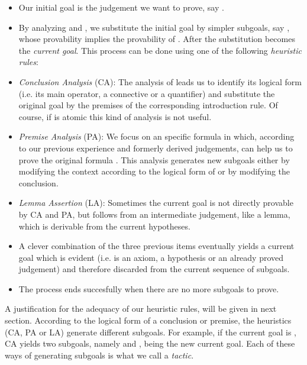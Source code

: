 \documentclass[a4paper,UKenglish]{lipics}
\begin{document}
\begin{itemize}
\item[]Our initial goal is the judgement we want to prove, say .
\item[]By analyzing  and , we substitute the initial goal  by simpler subgoals, say , whose provability implies the provability of . After the substitution  becomes the {\sl current goal}. This process can be done using one of the following {\em heuristic rules}:
\item[] {\em Conclusion Analysis} (CA): The analysis of  leads us to identify its 
logical form (i.e. its main operator, a connective or a quantifier) and substitute the original goal by the premises of the corresponding introduction rule. Of course, if  is atomic this kind of analysis is not useful. 
\item[]{\em Premise Analysis} (PA): We focus on an specific formula  in  which, according to our previous experience and formerly derived judgements, can help us to prove the original formula . This analysis generates new subgoals either by modifying the context according to the logical form of  or by modifying the conclusion. 
\item[]{\em Lemma Assertion} (LA): Sometimes the current goal is not directly provable by CA and PA, but follows from an intermediate judgement, like a lemma, which is derivable from the current hypotheses.   
\item[]A clever combination of the three previous items eventually yields a current goal which is evident (i.e. is an axiom, a hypothesis or an already proved judgement) and therefore discarded from the current sequence of subgoals.
\item[]The process ends succesfully when there are no more subgoals to prove. \\
\end{itemize}

A justification for the adequacy of our heuristic rules, will be given in next section.  According to the logical form of a conclusion or premise, the heuristics (CA, PA or LA) generate different subgoals. For example, if the current goal is , CA yields two subgoals, namely  and , being  the new current goal. Each of these ways of generating subgoals is what we call a {\em tactic}.  \\
\end{document}
